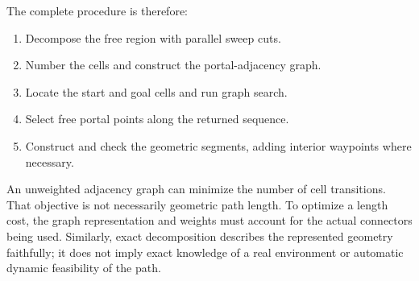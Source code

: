 The complete procedure is therefore:
\begin{enumerate}
\item Decompose the free region with parallel sweep cuts.
\item Number the cells and construct the portal-adjacency graph.
\item Locate the start and goal cells and run graph search.
\item Select free portal points along the returned sequence.
\item Construct and check the geometric segments, adding interior
waypoints where necessary.
\end{enumerate}
An unweighted adjacency graph can minimize the number of cell transitions.
That objective is not necessarily geometric path length. To optimize a
length cost, the graph representation and weights must account for the
actual connectors being used. Similarly, exact decomposition describes
the represented geometry faithfully; it does not imply exact knowledge
of a real environment or automatic dynamic feasibility of the path.
